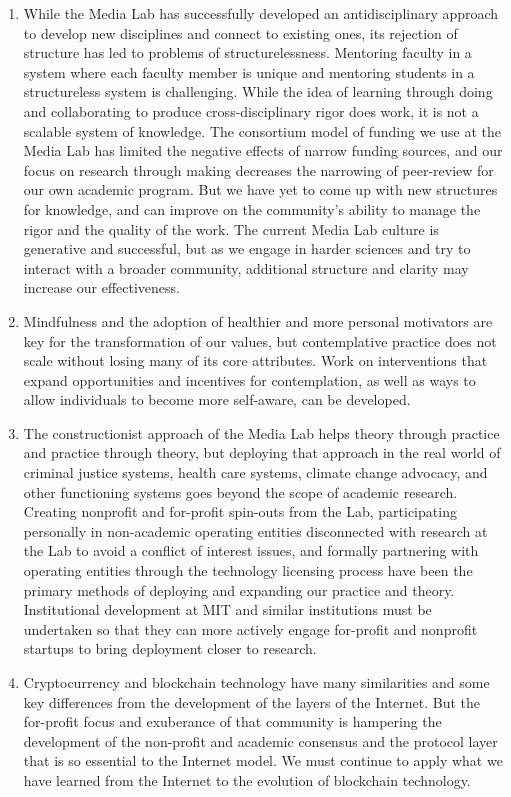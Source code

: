 \begin{enumerate}
\item While the Media Lab has successfully developed an antidisciplinary approach to develop new disciplines and connect to existing ones, its rejection of structure has led to problems of structurelessness. Mentoring faculty in a system where each faculty member is unique and mentoring students in a structureless system is challenging. While the idea of learning through doing and collaborating to produce cross-disciplinary rigor does work, it is not a scalable system of knowledge. The consortium model of funding we use at the Media Lab has limited the negative effects of narrow funding sources, and our focus on research through making decreases the narrowing of peer-review for our own academic program. But we have yet to come up with new structures for knowledge, and can improve on the community's ability to manage the rigor and the quality of the work. The current Media Lab culture is generative and successful, but as we engage in harder sciences and try to interact with a broader community, additional structure and clarity may increase our effectiveness.
\item Mindfulness and the adoption of healthier and more personal motivators are key for the transformation of our values, but contemplative practice does not scale without losing many of its core attributes. Work on interventions that expand opportunities and incentives for contemplation, as well as ways to allow individuals to become more self-aware, can be developed.
\item The constructionist approach of the Media Lab helps theory through practice and practice through theory, but deploying that approach in the real world of criminal justice systems, health care systems, climate change advocacy, and other functioning systems goes beyond the scope of academic research. Creating nonprofit and for-profit spin-outs from the Lab, participating personally in non-academic operating entities disconnected with research at the Lab to avoid a conflict of interest issues, and formally partnering with operating entities through the technology licensing process have been the primary methods of deploying and expanding our practice and theory. Institutional development at MIT and similar institutions must be undertaken so that they can more actively engage for-profit and nonprofit startups to bring deployment closer to research.
\item Cryptocurrency and blockchain technology have many similarities and some key differences from the development of the layers of the Internet. But the for-profit focus and exuberance of that community is hampering the development of the non-profit and academic consensus and the protocol layer that is so essential to the Internet model. We must continue to apply what we have learned from the Internet to the evolution of blockchain technology.

\end{enumerate}
